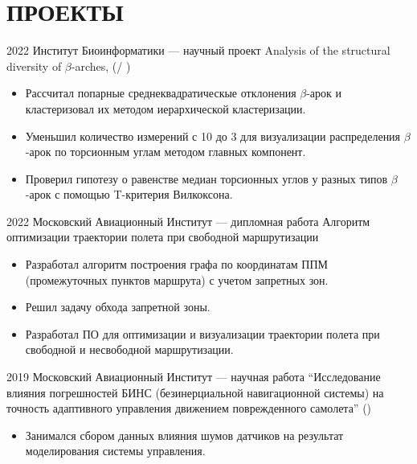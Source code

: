 \section{ПРОЕКТЫ}

    \project
    {2022}
    {Институт Биоинформатики — научный проект}
    {Analysis of the structural diversity of $\beta$-arches, 
    (/%
    )}
    {
        \begin{itemize}
            \setlength\itemsep{-.5em}
            \item Рассчитал попарные среднеквадратическые отклонения $\beta$-арок и кластеризовал их методом иерархической кластеризации.
            \item Уменьшил количество измерений с 10 до 3 для визуализации распределения $\beta$-арок по торсионным углам методом главных компонент.
            \item Проверил гипотезу о равенстве медиан торсионных углов у разных типов $\beta$-арок с помощью T-критерия Вилкоксона.
        \end{itemize}
    }
    
    \project
    {2022}
    {Московский Авиационный Институт — дипломная работа}
    {Алгоритм оптимизации траектории полета при свободной маршрутизации}
    {
        \begin{itemize}
            \setlength\itemsep{-.5em}
            \item Разработал алгоритм построения графа по координатам ППМ (промежуточных пунктов маршрута) с учетом запретных зон.
            \item Решил задачу обхода запретной зоны.
            \item Разработал ПО для оптимизации и визуализации траектории полета при свободной и несвободной маршрутизации.
        \end{itemize}
    }
    
    \project
    {2019}
    {Московский Авиационный Институт — научная работа}
    {“Исследование влияния погрешностей БИНС (безинерциальной навигационной системы) на точность адаптивного управления движением поврежденного самолета” 
    ()}
    {
        \begin{itemize}
            \setlength\itemsep{-.5em}
            \item Занимался сбором данных влияния шумов датчиков на результат моделирования системы управления.
        \end{itemize}
    }
